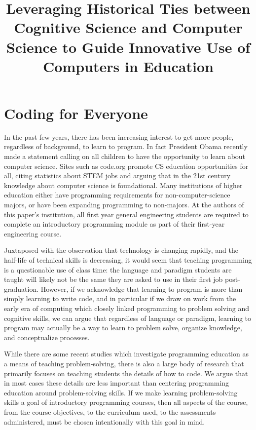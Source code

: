 \documentclass[12pt]{article}
\title{\large \textbf{Leveraging Historical Ties between Cognitive Science and
  Computer Science to Guide Innovative Use of Computers in Education}}
\author{}
\date{}
\begin{document}
\raggedright
\maketitle
\thispagestyle{empty}
\pagestyle{empty}

\section*{Coding for Everyone}
In the past few years, there has been increasing interest to get more
people, regardless of background, to learn to program. In fact
President Obama recently made a statement calling on all children to
have the opportunity to learn about computer
science\autocite{whitehouse_computer_2016}. Sites such as code.org
promote CS education opportunities for all, citing statistics about
STEM jobs and arguing that in the 21st century knowledge about
computer science is foundational\autocite{code.org_every_2016}. Many
institutions of higher education either have programming requirements
for non-computer-science majors, or have been expanding programming to
non-majors\autocite{rich_cs1_2004,forte_motivation_2005,guzdial_design_2005}. At
the authors of this paper's institution, all first year general
engineering students are required to complete an introductory
programming module as part of their first-year engineering course.

Juxtaposed with the observation that technology is changing rapidly,
and the half-life of technical skills is
decreasing\autocite{nae_educating_2004}, it would seem that teaching
programming is a questionable use of class time: the language and
paradigm students are taught will likely not be the same they are
asked to use in their first job post-graduation. However, if we
acknowledge that learning to program is more than simply learning to
write code, and in particular if we draw on work from the early era of
computing which closely linked programming to problem solving and
cognitive skills, we can argue that regardless of language or
paradigm, learning to program may actually be a way to learn to
problem solve, organize knowledge, and conceptualize processes.

While there are some recent studies which investigate programming
education as a means of teaching problem-solving, there is also a
large body of research that primarily focuses on teaching students the
details of how to code. We argue that in most cases these details are
less important than centering programming education around
problem-solving skills. If we make learning problem-solving skills a
goal of introductory programming courses, then all aspects of the
course, from the course objectives, to the curriculum used, to the
assessments administered, must be chosen intentionally with this goal
in mind. 
\end{document}
